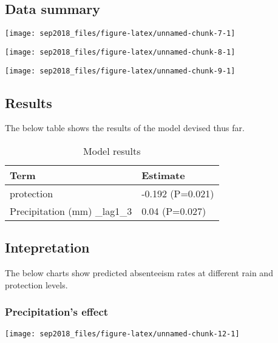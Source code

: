 \documentclass[]{article}
\begin{document}
\subsection{Data summary}\label{data-summary}

\begin{center}\texttt{[image: sep2018\_files/figure-latex/unnamed-chunk-7-1]} \end{center}

\begin{center}\texttt{[image: sep2018\_files/figure-latex/unnamed-chunk-8-1]} \end{center}

\begin{center}\texttt{[image: sep2018\_files/figure-latex/unnamed-chunk-9-1]} \end{center}

\newpage

\subsection{Results}\label{results}

The below table shows the results of the model devised thus far.

\begin{longtable}[t]{ll}
\caption{\label{tab:unnamed-chunk-10}Model results}\\
\toprule
Term & Estimate\\
\midrule
protection & -0.192 (P=0.021)\\
Precipitation (mm) \_lag1\_3 & 0.04 (P=0.027)\\
\bottomrule
\end{longtable}

\subsection{Intepretation}\label{intepretation}

The below charts show predicted absenteeism rates at different rain and
protection levels.

\subsubsection{Precipitation's effect}\label{precipitations-effect}

\begin{center}\texttt{[image: sep2018\_files/figure-latex/unnamed-chunk-12-1]} \end{center}
\end{document}
